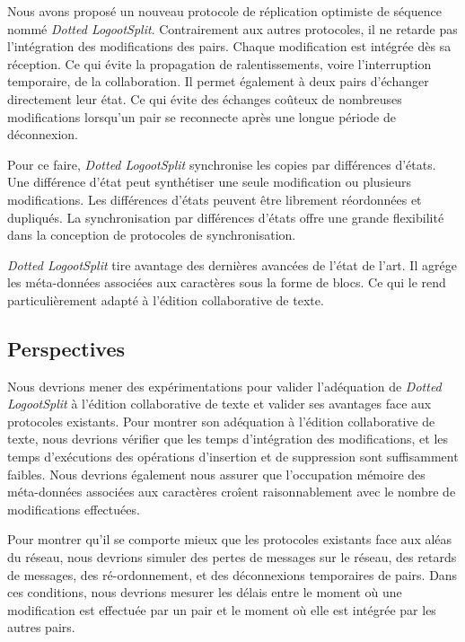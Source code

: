 Nous avons proposé un nouveau protocole de réplication optimiste de séquence nommé \emph{Dotted LogootSplit}.
Contrairement aux autres protocoles, il ne retarde pas l'intégration des modifications des pairs.
Chaque modification est intégrée dès sa réception.
Ce qui évite la propagation de ralentissements, voire l'interruption temporaire, de la collaboration.
Il permet également à deux pairs d'échanger directement leur état.
Ce qui évite des échanges coûteux de nombreuses modifications lorsqu'un pair se reconnecte après une longue période de déconnexion.

Pour ce faire, \emph{Dotted LogootSplit} synchronise les copies par différences d'états.
Une différence d'état peut synthétiser une seule modification ou plusieurs modifications.
Les différences d'états peuvent être librement réordonnées et dupliqués.
La synchronisation par différences d'états offre une grande flexibilité dans la conception de protocoles de synchronisation.

\emph{Dotted LogootSplit} tire avantage des dernières avancées de l'état de l'art.
Il agrége les méta-données associées aux caractères sous la forme de blocs.
Ce qui le rend particulièrement adapté à l'édition collaborative de texte.

\subsection{Perspectives}

Nous devrions mener des expérimentations pour valider l'adéquation de \emph{Dotted LogootSplit} à l'édition collaborative de texte et valider ses avantages face aux protocoles existants.
Pour montrer son adéquation à l'édition collaborative de texte, nous devrions vérifier que les temps d'intégration des modifications, et les temps d'exécutions des opérations d'insertion et de suppression sont suffisamment faibles.
Nous devrions également nous assurer que l'occupation mémoire des méta-données associées aux caractères croîent raisonnablement avec le nombre de modifications effectuées.

Pour montrer qu'il se comporte mieux que les protocoles existants face aux aléas du réseau, nous devrions simuler des pertes de messages sur le réseau, des retards de messages, des ré-ordonnement, et des déconnexions temporaires de pairs.
Dans ces conditions, nous devrions mesurer les délais entre le moment où une modification est effectuée par un pair et le moment où elle est intégrée par les autres pairs.

